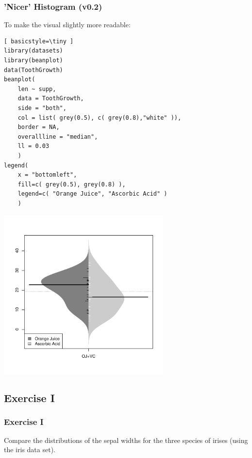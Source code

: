 \begin{frame}
\frametitle{'Nicer' Histogram (v0.2)}
To make the visual slightly more readable:

	\begin{lstlisting}[ basicstyle=\tiny ]
library(datasets)
library(beanplot)
data(ToothGrowth)
beanplot(
	len ~ supp, 
	data = ToothGrowth, 
	side = "both", 
	col = list( grey(0.5), c( grey(0.8),"white" )), 
	border = NA, 
	overallline = "median", 
	ll = 0.03
	)
legend(
	x = "bottomleft",
	fill=c( grey(0.5), grey(0.8) ), 
	legend=c( "Orange Juice", "Ascorbic Acid" )
	)
	\end{lstlisting}
	
        \begin{center}
	         \includegraphics[width=0.65\textwidth]{images/beanplot.pdf}
        \end{center}
\end{frame}

%





\subsection{Exercise I}
\begin{frame}
	\frametitle{Exercise I}
	Compare the distributions of the sepal widths for the three species of irises (using the \ttfamily iris \normalfont data set).
\end{frame}
